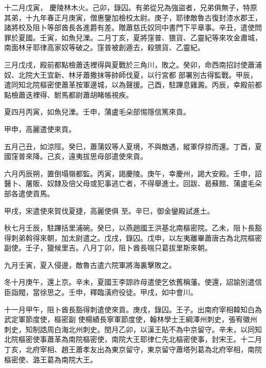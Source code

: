 \begin{pinyinscope}
 十二月戊寅，
 慶陵林木火。己卯，錄囚。有弟從兄為強盜者，兄弟俱無子，特原其弟，十九年春正月庚寅，僧惠鑒加檢校太尉。庚子，耶律敵魯古復封漆水郡王，諸將校及阻卜等部酋長各進爵有差。贈蕭慈氏奴同中書門下平章事。辛丑，遣使問罪於夏國。壬寅，如魚兒濼。二月丁亥，夏將窪普、猥貨、乙靈紀等來攻金肅城，南面林牙耶律高家奴等破之。窪普被創遁去，殺猥貨、乙靈紀。



 三月戊戌，殿前都點檢蕭迭裡得與夏戰於三角川，敗之。癸卯，命西南招討使蕭浦奴、北院大王宜新、林牙蕭撒抹等帥師伐夏，以行宮都
 部署別古得監戰。甲辰，遣同知北院樞密使蕭革按軍邊城，以為聲援。己酉，駐蹕息雞澱。丙辰，幸殿前都點檢蕭迭裡得、駙馬都尉蕭胡睹帳視疾。



 夏四月丙寅，如魚兒濼。壬申，蒲盧毛朵部惕隱信篤來貢。



 甲申，高麗遣使來貢。



 五月己丑，如涼陘。癸巳，蕭蒲奴等人夏境，不與敵遇，縱軍俘掠而還。丁酉，夏國窪普來降。己亥，遠夷拔思母部遣使來貢。



 六月丙辰朔，置倒塌嶺都監。丙寅，謁慶陵。庚午，幸慶州，謁大安殿。壬申，詔醫卜、屠販、奴隸及倍父母或犯事逃亡者，不得舉進士。回跋、曷蘇館、蒲盧毛朵部各遣使貢馬。



 甲戌，宋遣使來賀伐夏捷，高麗使俱
 至。辛巳，御金鑾殿試進土。



 秋七月壬辰，駐蹕括里浦碗。癸巳，以燕趙國王洪基北南樞密院。乙未，阻卜長豁得刺弟斡得來朝，加太尉遣之。戊戌，錄囚。戊申，以左夷離畢蕭唐古為北院樞密副使。壬子，獵候里吉。八月丁卯，阻卜酋長喘只葛拔里斯來朝。



 九月壬寅，夏入侵邊，敵魯古遣六院軍將海裏擊敗之。



 冬十月庚午，還上京。辛未，夏國王李諒祚母遣使乞依舊稱藩。使還，詔諭別遣信臣詣閥，當徐思之。壬申，釋臨潢府役徒。甲戌，如中會川。



 十一月甲午，阻卜酋長豁得刺遣使來貢。庚戌，錄囚。王子。出南府宰相韓知白為武定軍節度使，樞密副
 使楊績長寧軍節度使，翰林學士王綱澤州刺史，張宥徽州刺史，知制誥周白海北州刺史。閏月乙卯，以漢王貼不為中京留守。辛未，以同知北院樞密使事蕭革為南院樞密使，南院大王耶律仁先北樞密使事，封宋王。十二月丁亥，北府宰相、趙王蕭孝友出為東京留守，東京留守蕭塔列葛為北府宰相，南院樞密使、潞王葛為南院大王。




\end{pinyinscope}
